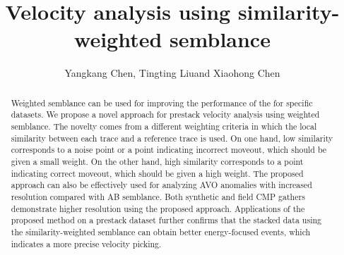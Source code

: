 
\title{Velocity analysis using similarity-weighted semblance}

\renewcommand{\thefootnote}{\fnsymbol{footnote}}

\author{Yangkang Chen\footnotemark[1], Tingting Liu\footnotemark[2] and Xiaohong Chen\footnotemark[2]}


\address{
\footnotemark[1]Bureau of Economic Geology \\
John A. and Katherine G. Jackson School of Geosciences \\
The University of Texas at Austin \\
University Station, Box X \\
Austin, TX 78713-8924 \\
ykchen@utexas.edu\\

\footnotemark[2] State Key Laboratory of Petroleum Resources and Prospecting \\
China University of Petroleum \\
Fuxue Road 18th\\
Beijing, China, 102200 \\
liutingjiy@126.com \& chenxh@cup.edu.cn\\
}


\maketitle

\begin{abstract}
Weighted semblance can be used for improving the performance of the  for specific datasets. We propose a novel approach for prestack velocity analysis using weighted semblance. The novelty comes from a different weighting criteria in which the local similarity between each trace and a reference trace is used. On one hand, low similarity corresponds to a noise point or a point indicating incorrect moveout, which should be given a small weight. On the other hand, high similarity corresponds to a point indicating correct moveout, which should be given a high weight. %
The proposed approach can also be effectively used for analyzing AVO anomalies with increased resolution compared with AB semblance. Both synthetic and field CMP gathers demonstrate higher resolution using the proposed approach. Applications of the proposed method on a prestack dataset further confirms that the stacked data using the similarity-weighted semblance can obtain better energy-focused events, which indicates a more precise velocity picking.
\end{abstract}


